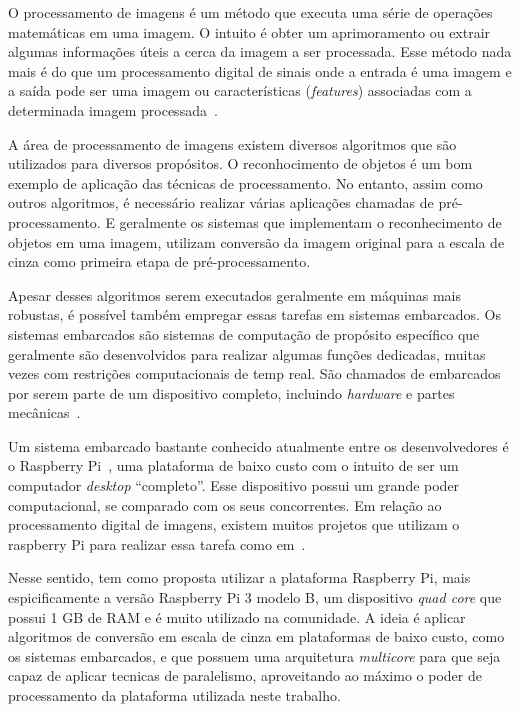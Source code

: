O processamento de imagens é um método que executa uma série de operações
matemáticas em uma imagem. O intuito é obter um aprimoramento ou extrair algumas
informações úteis a cerca da imagem a ser processada. Esse método nada mais é do
que um processamento digital de sinais onde a entrada é uma imagem e a saída
pode ser uma imagem ou características (\textit{features}) associadas com a
determinada imagem processada~\cite{Tartu19}.

A área de processamento de imagens existem diversos algoritmos que são
utilizados para diversos propósitos. O reconhocimento de objetos é um bom
exemplo de aplicação das técnicas de processamento. No entanto, assim como
outros algoritmos, é necessário realizar várias aplicações chamadas de
pré-processamento. E geralmente os sistemas que implementam o reconhecimento de
objetos em uma imagem, utilizam conversão da imagem original para a escala de
cinza como primeira etapa de pré-processamento.

Apesar desses algoritmos serem executados geralmente em máquinas mais robustas,
é possível também empregar essas tarefas em sistemas embarcados. Os sistemas
embarcados são sistemas de computação de propósito específico  que geralmente
são desenvolvidos para realizar algumas funções dedicadas, muitas vezes com
restrições computacionais de temp real. São chamados de embarcados por serem
parte de um dispositivo completo, incluindo \textit{hardware} e partes
mecânicas~\cite{Lamb15}.

Um sistema embarcado bastante conhecido atualmente entre os desenvolvedores é o
Raspberry Pi~\cite{raspberry}, uma plataforma de baixo custo com o intuito de
ser um computador \textit{desktop} ``completo''. Esse dispositivo possui um
grande poder computacional, se comparado com os seus concorrentes. Em relação ao
processamento digital de imagens, existem muitos projetos que utilizam o
raspberry Pi para realizar essa tarefa como em~\cite{Shilpashree15}.

Nesse sentido, tem como proposta utilizar a plataforma Raspberry Pi, mais
espicificamente a versão Raspberry Pi 3 modelo B, um dispositivo \textit{quad core} 
que possui 1 GB de RAM e é muito utilizado na comunidade. A ideia é
aplicar algoritmos de conversão em escala de cinza em plataformas de baixo
custo, como os sistemas embarcados, e que possuem uma arquitetura
\textit{multicore} para que seja capaz de aplicar tecnicas de paralelismo,
aproveitando ao máximo o poder de processamento da plataforma utilizada neste
trabalho.
